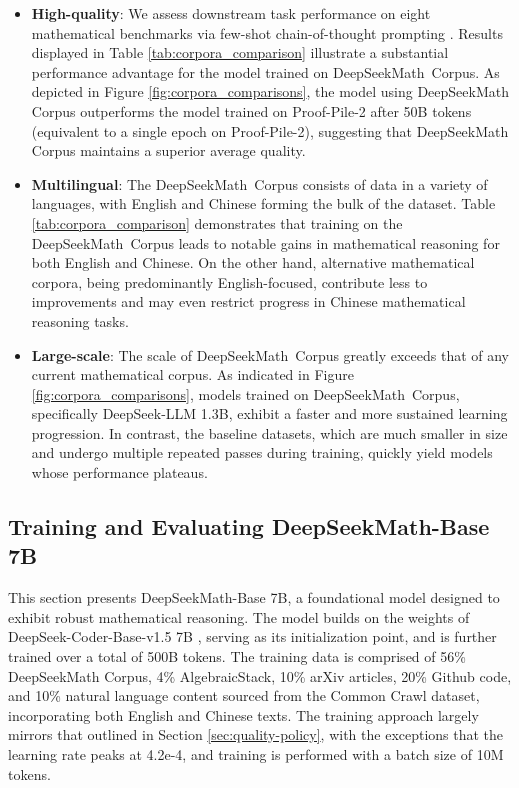 \begin{itemize}[topsep=0pt]
    \item \textbf{High-quality}: 
    We assess downstream task performance on eight mathematical benchmarks via few-shot chain-of-thought prompting \cite{cot}. Results displayed in Table \ref{tab:corpora_comparison} illustrate a substantial performance advantage for the model trained on DeepSeekMath~Corpus. As depicted in Figure \ref{fig:corpora_comparisons}, the model using DeepSeekMath Corpus outperforms the model trained on Proof-Pile-2 after 50B tokens (equivalent to a single epoch on Proof-Pile-2), suggesting that DeepSeekMath Corpus maintains a superior average quality.
    \item \textbf{Multilingual}: 
    The DeepSeekMath~Corpus consists of data in a variety of languages, with English and Chinese forming the bulk of the dataset. Table \ref{tab:corpora_comparison} demonstrates that training on the DeepSeekMath~Corpus leads to notable gains in mathematical reasoning for both English and Chinese. On the other hand, alternative mathematical corpora, being predominantly English-focused, contribute less to improvements and may even restrict progress in Chinese mathematical reasoning tasks.
    \item \textbf{Large-scale}: 
    The scale of DeepSeekMath~Corpus greatly exceeds that of any current mathematical corpus. As indicated in Figure \ref{fig:corpora_comparisons}, models trained on DeepSeekMath~Corpus, specifically DeepSeek-LLM 1.3B, exhibit a faster and more sustained learning progression. In contrast, the baseline datasets, which are much smaller in size and undergo multiple repeated passes during training, quickly yield models whose performance plateaus.
\end{itemize}

\subsection{Training and Evaluating DeepSeekMath-Base 7B}

This section presents DeepSeekMath-Base 7B, a foundational model designed to exhibit robust mathematical reasoning. The model builds on the weights of DeepSeek-Coder-Base-v1.5 7B \citep{deepseek-coder}, serving as its initialization point, and is further trained over a total of 500B tokens. The training data is comprised of 56\% DeepSeekMath Corpus, 4\% AlgebraicStack, 10\% arXiv articles, 20\% Github code, and 10\% natural language content sourced from the Common Crawl dataset, incorporating both English and Chinese texts. The training approach largely mirrors that outlined in Section \ref{sec:quality-policy}, with the exceptions that the learning rate peaks at 4.2e-4, and training is performed with a batch size of 10M tokens.


